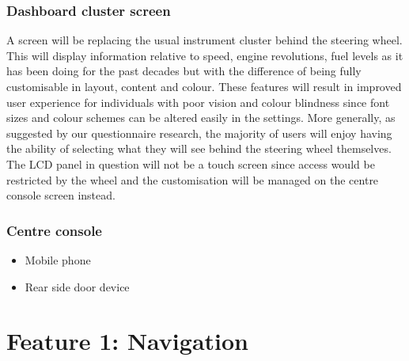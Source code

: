 \documentclass{article}
\begin{document}
\subsubsection{Dashboard cluster screen}\label{sssec:cluster-screen}
A screen will be replacing the usual instrument cluster behind the steering wheel. This will display information relative to speed, engine revolutions, fuel levels as it has been doing for the past decades but with the difference of being fully customisable in layout, content and colour. These features will result in improved user experience for individuals with poor vision and colour blindness since font sizes and colour schemes can be altered easily in the settings. More generally, as suggested by our questionnaire research, the majority of users will enjoy having the ability of selecting what they will see behind the steering wheel themselves. The LCD panel in question will not be a touch screen since access would be restricted by the wheel and the customisation will be managed on the centre console screen instead.

\subsubsection{Centre console}\label{sssec:centre-console-aestethics}


\begin{itemize}
  \item Mobile phone
  \item Rear side door device
\end{itemize}




%
%
\section{Feature 1: Navigation}\label{sec:nav}
\end{document}
